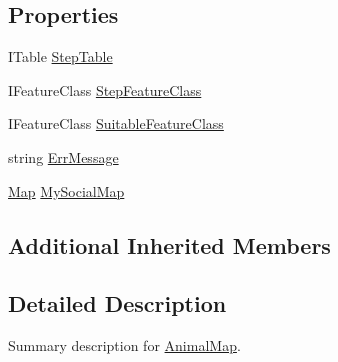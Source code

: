 \subsection*{Properties}
\begin{DoxyCompactItemize}
\item 
I\-Table \hyperlink{class_p_a_z___dispersal_1_1_animal_map_ac86a6ffa7fc8497a10260fd32468dd23}{Step\-Table}
\item 
I\-Feature\-Class \hyperlink{class_p_a_z___dispersal_1_1_animal_map_a001cc88cc26b247dcc748e56cd0c5fe0}{Step\-Feature\-Class}
\item 
I\-Feature\-Class \hyperlink{class_p_a_z___dispersal_1_1_animal_map_a1b42214a1c3f84954e327bd3c8e7472c}{Suitable\-Feature\-Class}
\item 
string \hyperlink{class_p_a_z___dispersal_1_1_animal_map_a35ef7adbb4f68d2c344f5cca900c5262}{Err\-Message}
\item 
\hyperlink{class_p_a_z___dispersal_1_1_map}{Map} \hyperlink{class_p_a_z___dispersal_1_1_animal_map_ad78e7e62aa0af7c84c38181c17cc1072}{My\-Social\-Map}
\end{DoxyCompactItemize}
\subsection*{Additional Inherited Members}


\subsection{Detailed Description}
Summary description for \hyperlink{class_p_a_z___dispersal_1_1_animal_map}{Animal\-Map}. 




